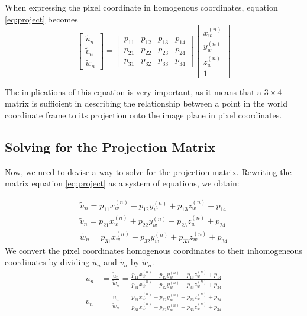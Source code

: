 When expressing the pixel coordinate in homogenous coordinates, equation \ref{eq:project} becomes
\begin{equation} \label{eq:proj}
    \begin{bmatrix}
        \widetilde{u}_n \\ \widetilde{v}_n \\ \widetilde{w}_n
    \end{bmatrix}
    =
    \begin{bmatrix}
        p_{11} & p_{12} & p_{13} & p_{14} \\
        p_{21} & p_{22} & p_{23} & p_{24} \\
        p_{31} & p_{32} & p_{33} & p_{34}
    \end{bmatrix}
    \begin{bmatrix}
        x_w^{(n)} \\ y_w^{(n)} \\ z_w^{(n)} \\ 1
    \end{bmatrix}
\end{equation}

The implications of this equation is very important, as it means that a $3 \times 4$ matrix is sufficient in describing the relationship between a point in the world coordinate frame to its projection onto the image plane in pixel coordinates.

\subsection{Solving for the Projection Matrix}

Now, we need to devise a way to solve for the projection matrix. Rewriting the matrix equation \ref{eq:project} as a system of equations, we obtain:

\begin{align*}
    \widetilde{u}_n = p_{11}x_w^{(n)} + p_{12}y_w^{(n)} + p_{13}z_w^{(n)} + p_{14} \\
    \widetilde{v}_n = p_{21}x_w^{(n)} + p_{22}y_w^{(n)} + p_{23}z_w^{(n)} + p_{24} \\
    \widetilde{w}_n = p_{31}x_w^{(n)} + p_{32}y_w^{(n)} + p_{33}z_w^{(n)} + p_{34}
\end{align*}
We convert the pixel coordinates homogenous coordinates to their inhomogeneous coordinates by dividing $\widetilde{u}_n$ and $\widetilde{v}_n$ by $\widetilde{w}_n$. 
\begin{align*}
    u_n & = \frac{\widetilde{u}_n}{\widetilde{w}_n} = \frac{p_{11}x_w^{(n)} + p_{12}y_w^{(n)} + p_{13}z_w^{(n)} + p_{14}}{p_{31}x_w^{(n)} + p_{32}y_w^{(n)} + p_{33}z_w^{(n)} + p_{34}} \\
    v_n & = \frac{\widetilde{u}_n}{\widetilde{w}_n} = \frac{p_{21}x_w^{(n)} + p_{22}y_w^{(n)} + p_{23}z_w^{(n)} + p_{24}}{p_{31}x_w^{(n)} + p_{32}y_w^{(n)} + p_{33}z_w^{(n)} + p_{34}}
\end{align*}

